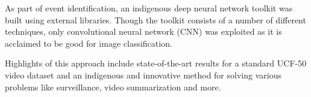 \par As part of event identification, an indigenous deep neural network toolkit was built using external libraries. Though the toolkit consists of a number of different techniques, only convolutional neural network (CNN) was exploited as it is acclaimed to be good for image classification. 

\par Highlights of this approach include state-of-the-art results for a standard UCF-50 video dataset and an indigenous and innovative method for solving various problems like surveillance, video summarization and more.  
\pagebreak